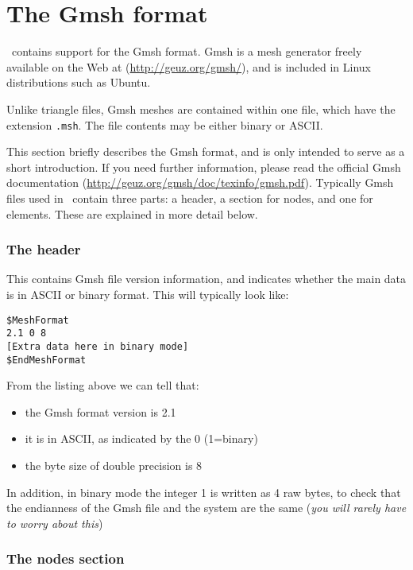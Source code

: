 \section{The Gmsh format}\label{sec:gmsh_format}

\fluidity\ contains  support for the Gmsh format. Gmsh is a mesh
generator freely available on the Web at (\url{http://geuz.org/gmsh/}), and 
is included in Linux distributions such as Ubuntu. 

Unlike triangle files, Gmsh meshes are contained within one file, which have
the extension \lstinline[language=bash]+.msh+. The file contents may
be either binary or ASCII.

This section briefly describes the Gmsh format, and is only intended
to serve as a short introduction. If you need further
information, please read the official Gmsh documentation
(\url{http://geuz.org/gmsh/doc/texinfo/gmsh.pdf}).
Typically Gmsh files used in \fluidity\ contain three parts: a header, a
section for nodes, and one for elements. These  are explained in more
detail below.

\subsubsection*{The header}\label{sec:gmsh_header_section}
This contains Gmsh file version information, and indicates whether 
the main data is in ASCII or binary format. This will typically look like:
\begin{lstlisting}
$MeshFormat
2.1 0 8
[Extra data here in binary mode]
$EndMeshFormat
\end{lstlisting}

From the listing above we can tell that:
\begin{itemize}
\item the Gmsh format version is 2.1
\item it is in ASCII, as indicated by the 0 (1=binary)
\item the byte size of double precision is 8
\end{itemize}
In addition, in binary mode the integer 1 is written as 4 raw bytes, to check that the endianness of the Gmsh file and the system are the same (\textit{you will rarely have to worry about this})


\subsubsection*{The nodes section}\label{sec:gmsh_nodes_section}

